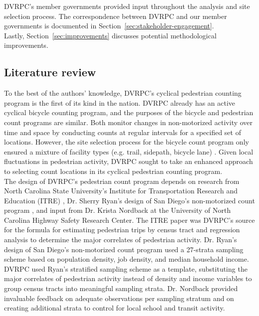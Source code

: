 \documentclass[paper=letterpaper, fontsize=11pt]{scrartcl}
\begin{document}
DVRPC's member governments provided input throughout the analysis and site selection process. The correspondence between DVRPC and our member governments is documented in Section~\ref{sec:stakeholder-engagement}.\\

Lastly, Section~\ref{sec:improvements} discusses potential methodological improvements.

\subsection{Literature review}
To the best of the authors' knowledge, DVRPC's cyclical pedestrian counting program is the first of its kind in the nation. DVRPC already has an active cyclical bicycle counting program, and the purposes of the bicycle and pedestrian count programs are similar. Both monitor changes in non-motorized activity over time and space by conducting counts at regular intervals for a specified set of locations. However, the site selection process for the bicycle count program only ensured a mixture of facility types (e.g. trail, sidepath, bicycle lane) \cite{dvrpc-bikes}. Given local fluctuations in pedestrian activity, DVRPC sought to take an enhanced approach to selecting count locations in its cyclical pedestrian counting program. \\

The design of DVRPC's pedestrian count program depends on research from North Carolina State University's Institute for Transportation Research and Education (ITRE) \cite{ncstate}, Dr. Sherry Ryan's design of San Diego's non-motorized count program \cite{ryan}, and input from Dr. Krista Nordback at the University of North Carolina Highway Safety Research Center. The ITRE paper was DVRPC's source for the formula for estimating pedestrian trips by census tract and regression analysis to determine the major correlates of pedestrian activity. Dr. Ryan's design of San Diego's non-motorized count program used a 27-strata sampling scheme based on population density, job density, and median household income. DVRPC used Ryan's stratified sampling scheme as a template, substituting the major correlates of pedestrian activity instead of density and income variables to group census tracts into meaningful sampling strata. Dr. Nordback provided invaluable feedback on adequate observations per sampling stratum and on creating additional strata to control for local school and transit activity.
\end{document}
